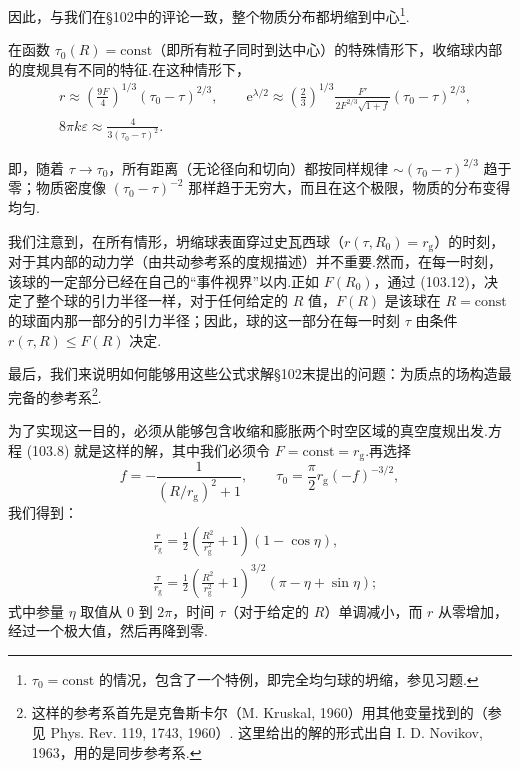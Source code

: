 因此，与我们在§102中的评论一致，整个物质分布都坍缩到中心\footnote{$\tau_{0}=\mathrm{const}$ 的情况，包含了一个特例，即完全均匀球的坍缩，参见习题.}.

在函数 $\tau_0(R)=\mathrm{const}$（即所有粒子同时到达中心）的特殊情形下，收缩球内部的度规具有不同的特征.在这种情形下，
\begin{equation}
\begin{aligned}
  &r\approx\left(\frac{9F}{4}\right)^{1/3}(\tau_0-\tau)^{2/3},
  \qquad
  \mathrm{e}^{\lambda/2}\approx\left(\frac{2}{3}\right)^{1/3}
  \frac{F'}{2F^{2/3}\sqrt{1+f}}(\tau_0-\tau)^{2/3},\\
  &8\pi k\varepsilon\approx\frac{4}{3(\tau_0-\tau)^{2}}.
\end{aligned}
\end{equation}

即，随着 $\tau\to\tau_0$，所有距离（无论径向和切向）都按同样规律 $\sim(\tau_0-\tau)^{2/3}$ 趋于零；物质密度像 $(\tau_0-\tau)^{-2}$ 那样趋于无穷大，而且在这个极限，物质的分布变得均匀.

我们注意到，在所有情形，坍缩球表面穿过史瓦西球（$r(\tau,R_0)=r_{\mathrm{g}}$）的时刻，对于其内部的动力学（由共动参考系的度规描述）并不重要.然而，在每一时刻，该球的一定部分已经在自己的“事件视界”以内.正如 $F(R_0)$，通过 (103.12)，决定了整个球的引力半径一样，对于任何给定的 $R$ 值，$F(R)$ 是该球在 $R=\mathrm{const}$ 的球面内那一部分的引力半径；因此，球的这一部分在每一时刻 $\tau$ 由条件 $r(\tau,R)\leqslant F(R)$ 决定.

最后，我们来说明如何能够用这些公式求解§102末提出的问题：为质点的场构造最完备的参考系\footnote{这样的参考系首先是克鲁斯卡尔（M. Kruskal, 1960）用其他变量找到的（参见 Phys. Rev. 119, 1743, 1960）. 这里给出的解的形式出自 I. D. Novikov, 1963，用的是同步参考系.}.

为了实现这一目的，必须从能够包含收缩和膨胀两个时空区域的真空度规出发.方程 (103.8) 就是这样的解，其中我们必须令 $F=\mathrm{const}=r_{\mathrm{g}}$.再选择
\begin{equation*}
  f=-\frac{1}{(R/r_{\mathrm{g}})^{2}+1},\qquad
  \tau_0=\frac{\pi}{2}r_{\mathrm{g}}(-f)^{-3/2},
\end{equation*}
我们得到：
\begin{equation}
\begin{aligned}
  &\frac{r}{r_{\mathrm{g}}}
  =\frac{1}{2}\left(\frac{R^{2}}{r_{\mathrm{g}}^{2}}+1\right)
  (1-\cos\eta),\\
  &\frac{\tau}{r_{\mathrm{g}}}
  =\frac{1}{2}\left(\frac{R^{2}}{r_{\mathrm{g}}^{2}}+1\right)^{3/2}
  (\pi-\eta+\sin\eta);
\end{aligned}
\end{equation}
式中参量 $\eta$ 取值从 0 到 $2\pi$，时间 $\tau$（对于给定的 $R$）单调减小，而 $r$ 从零增加，经过一个极大值，然后再降到零.

